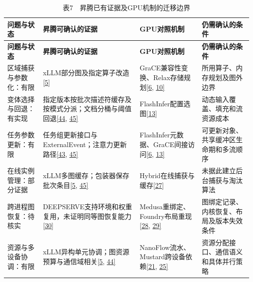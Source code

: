 \documentclass[UTF8,11pt,fontset=windows]{ctexart}
\begin{document}
\begingroup\small
\begin{longtable}[]{@{}>{\raggedright\arraybackslash}p{}>{\raggedright\arraybackslash}p{}>{\raggedright\arraybackslash}p{}>{\raggedright\arraybackslash}p{}@{}}
\caption{表7　昇腾已有证据及GPU机制的迁移边界}\tabularnewline
\toprule
\textbf{问题与状态} & \textbf{昇腾可确认的证据} & \textbf{GPU对照机制} & \textbf{仍需确认的条件} \\
\midrule
\endfirsthead
\toprule
\textbf{问题与状态} & \textbf{昇腾可确认的证据} & \textbf{GPU对照机制} & \textbf{仍需确认的条件} \\
\midrule
\endhead
区域捕获与参数化：有限 & xLLM部分图及指定算子改造\protect\hyperlink{ref-5}{{[}5{]}} & GraCE兼容性变换、Relax存储规划\protect\hyperlink{ref-6}{{[}6}, \protect\hyperlink{ref-10}{10{]}} & 所用算子、内存规划及图外边界 \\
变体选择与回退：有实现 & 指定版本按批次描述符缓存及按模式分派；文档分桶与阈值回退\protect\hyperlink{ref-44}{{[}44}, \protect\hyperlink{ref-45}{45{]}} & FlashInfer配置选图\protect\hyperlink{ref-13}{{[}13{]}} & 动态输入覆盖、填充和流资源成本 \\
任务参数更新：有限 & 任务组更新接口与ExternalEvent；注意力更新路径\protect\hyperlink{ref-43}{{[}43}, \protect\hyperlink{ref-45}{45{]}} & FlashInfer元数据、GraCE间接访问\protect\hyperlink{ref-6}{{[}6}, \protect\hyperlink{ref-13}{13{]}} & 可更新对象、共享缓冲区生命期和多流顺序 \\
在线实例管理：部分证据 & xLLM多图缓存；包装器保存批次条目\protect\hyperlink{ref-5}{{[}5}, \protect\hyperlink{ref-45}{45{]}} & Hybrid在线捕获与缓存\protect\hyperlink{ref-27}{{[}27{]}} & 未据此建立后台捕获与淘汰算法 \\
跨进程图恢复：待核实 & DEEPSERVE支持环境和权重复用，未证明同等图恢复能力\protect\hyperlink{ref-30}{{[}30{]}} & Medusa重绑定、Foundry布局重现\protect\hyperlink{ref-28}{{[}28}, \protect\hyperlink{ref-29}{29{]}} & 图绑定记录、内核恢复、布局及版本失效条件 \\
资源与多设备协调：有限 & xLLM异构单元协调；图资源预算与通信域相关\protect\hyperlink{ref-5}{{[}5}, \protect\hyperlink{ref-44}{44{]}} & NanoFlow流水、Mustard跨设备依赖\protect\hyperlink{ref-21}{{[}21}, \protect\hyperlink{ref-25}{25{]}} & 资源分配接口、通信语义和具体并行策略 \\
\bottomrule
\end{longtable}
\endgroup
\end{document}
